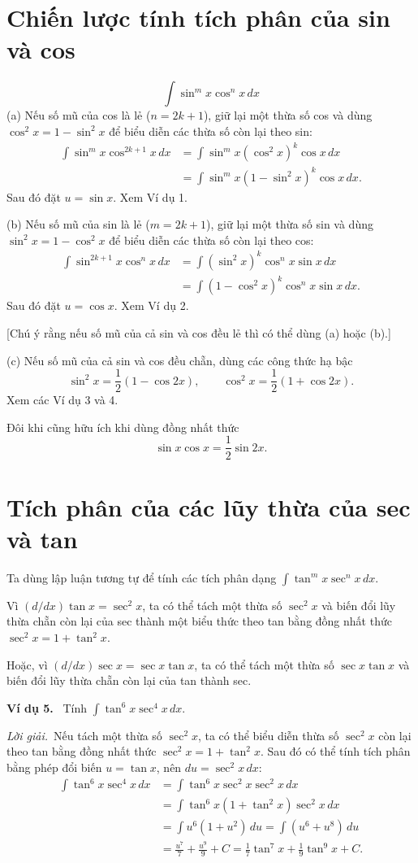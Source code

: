 \documentclass[12pt,a4paper]{article}
\newcommand{\ex}[1]{\par\medskip\noindent\textbf{Ví dụ #1.}\ }
\newcommand{\sol}{\par\nopagebreak[4]\noindent\textit{Lời giải.}\ }
\begin{document}
\section*{Chiến lược tính tích phân của sin và cos}
\[\int\sin^mx\cos^nx\,dx\]
(a) Nếu số mũ của cos là lẻ ($n=2k+1$), giữ lại một thừa số cos và dùng $\cos^2x=1-\sin^2x$ để biểu diễn các thừa số còn lại theo sin:
\begin{align*}
\int\sin^mx\cos^{2k+1}x\,dx&=\int\sin^mx(\cos^2x)^k\cos x\,dx\\
&=\int\sin^mx(1-\sin^2x)^k\cos x\,dx.
\end{align*}
Sau đó đặt $u=\sin x$. Xem Ví dụ 1.

(b) Nếu số mũ của sin là lẻ ($m=2k+1$), giữ lại một thừa số sin và dùng $\sin^2x=1-\cos^2x$ để biểu diễn các thừa số còn lại theo cos:
\begin{align*}
\int\sin^{2k+1}x\cos^nx\,dx&=\int(\sin^2x)^k\cos^nx\sin x\,dx\\
&=\int(1-\cos^2x)^k\cos^nx\sin x\,dx.
\end{align*}
Sau đó đặt $u=\cos x$. Xem Ví dụ 2.

[Chú ý rằng nếu số mũ của cả sin và cos đều lẻ thì có thể dùng (a) hoặc (b).]

(c) Nếu số mũ của cả sin và cos đều chẵn, dùng các công thức hạ bậc
\[\sin^2x=\frac12(1-\cos2x),\qquad\cos^2x=\frac12(1+\cos2x).\]
Xem các Ví dụ 3 và 4.

Đôi khi cũng hữu ích khi dùng đồng nhất thức
\[\sin x\cos x=\frac12\sin2x.\]

\section*{Tích phân của các lũy thừa của sec và tan}
Ta dùng lập luận tương tự để tính các tích phân dạng $\int\tan^mx\sec^nx\,dx$.\par
Vì $(d/dx)\tan x=\sec^2x$, ta có thể tách một thừa số $\sec^2x$ và biến đổi lũy thừa chẵn còn lại của sec thành một biểu thức theo tan bằng đồng nhất thức $\sec^2x=1+\tan^2x$. 

Hoặc, vì $(d/dx)\sec x=\sec x\tan x$, ta có thể tách một thừa số $\sec x\tan x$ và biến đổi lũy thừa chẵn còn lại của tan thành sec.

\ex{5} Tính $\displaystyle\int\tan^6x\sec^4x\,dx$.
\sol Nếu tách một thừa số $\sec^2x$, ta có thể biểu diễn thừa số $\sec^2x$ còn lại theo tan bằng đồng nhất thức $\sec^2x=1+\tan^2x$. Sau đó có thể tính tích phân bằng phép đổi biến $u=\tan x$, nên $du=\sec^2x\,dx$:
\begin{align*}
\int\tan^6x\sec^4x\,dx&=\int\tan^6x\sec^2x\sec^2x\,dx\\
&=\int\tan^6x(1+\tan^2x)\sec^2x\,dx\\
&=\int u^6(1+u^2)\,du=\int(u^6+u^8)\,du\\
&=\frac{u^7}{7}+\frac{u^9}{9}+C=\frac17\tan^7x+\frac19\tan^9x+C.
\end{align*}
\end{document}
